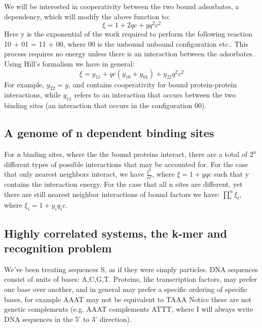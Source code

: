 We will be interested in cooperativity between the two bound adsorbates, a dependency, which will modify the above function to:
\begin{equation}\label{}
  \xi = 1 + 2qc + y q^2 c^2
\end{equation}
Here y is the exponential of the work required to perform the following reaction 10 + 01 = 11 + 00, where 00 is the unbound unbound configuration etc..  This process requires no energy unless there is an interaction between the adsorbates.  Using Hill's formalism we have in general:
\begin{equation}\label{y11}
   \xi = y_{11} + qc(y_{10} + y_{01}) + y_{22}q^2 c^2
\end{equation}
For example, $y_{22}=y$, and contains cooperativity for bound protein-protein interactions, while $y_{11}$ refers to an interaction that occurs between the two binding sites (an interaction that occurs in the configuration 00).

\subsection{A genome of n dependent binding sites}
For n binding sites, where the the bound proteins interact, there are a total of $2^n$ different types of possible interactions that may be accounted for.  For the case that only nearest neighbors interact, we have $\frac{\xi^n}{n!}$, where $\xi=1+yqc$ such that y contains the interaction energy.  For the case that all n sites are different, yet there are still nearest neighbor interactions of bound factors we have: $\prod_i^n \xi_i$, where $\xi_i=1+y_i q_i c$.

\subsection{Highly correlated systems, the k-mer and recognition problem}


We've been treating sequences S, as if they were simply particles. DNA sequences consist of units of bases: A,C,G,T.  Proteins, like transcription factors, may prefer one base over another, and in general may prefer a specific ordering of specific bases, for example AAAT may not be equivalent to TAAA  Notice these are not genetic complements (e.g. AAAT complements ATTT, where I will always write DNA sequences in the 5' to 3' direction). 

